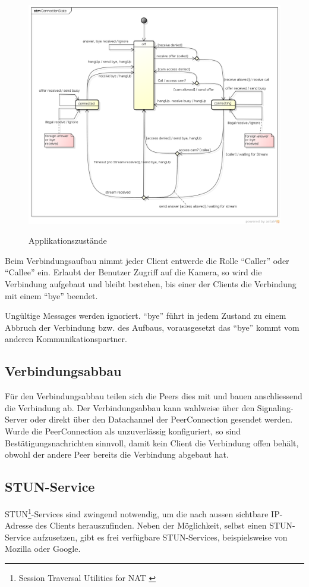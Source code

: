 		\begin{figure}[H]
			\centering
			\includegraphics[width=\linewidth]{../architekturanalayse/img/connectionState.png}
			\label{img:deployment}
			\caption{Applikationszustände}
		\end{figure}
		Beim Verbindungsaufbau nimmt jeder Client entwerde die Rolle "`Caller"' oder
		"`Callee"' ein. Erlaubt der Benutzer Zugriff auf die Kamera, so wird die
		Verbindung aufgebaut und bleibt bestehen, bis einer der Clients die Verbindung mit einem "`bye"' beendet.
		
		Ungültige Messages werden ignoriert. "`bye"' führt in jedem Zustand zu einem
		Abbruch der Verbindung bzw. des Aufbaus, vorausgesetzt das "`bye"'
		kommt vom anderen Kommunikationspartner.
	
	\subsection{Verbindungsabbau}
		Für den Verbindungsabbau teilen sich die Peers dies mit und bauen anschliessend die Verbindung ab. Der Verbindungsabbau kann wahlweise über den Signaling-Server oder direkt über den Datachannel der PeerConnection gesendet werden. Wurde die PeerConnection als unzuverlässig konfiguriert, so sind Bestätigungsnachrichten sinnvoll, damit kein Client die Verbindung offen behält, obwohl der andere Peer bereits die Verbindung abgebaut hat.
	
	\subsection{STUN-Service}
		STUN\footnote{Session Traversal Utilities for NAT \cite{IETF-STUN-RFC}}-Services sind zwingend
		notwendig, um die nach aussen sichtbare IP-Adresse des Clients herauszufinden.
		Neben der Möglichkeit, selbst einen STUN-Service aufzusetzen, gibt es frei
		verfügbare STUN-Services, beispielsweise von Mozilla oder Google.

